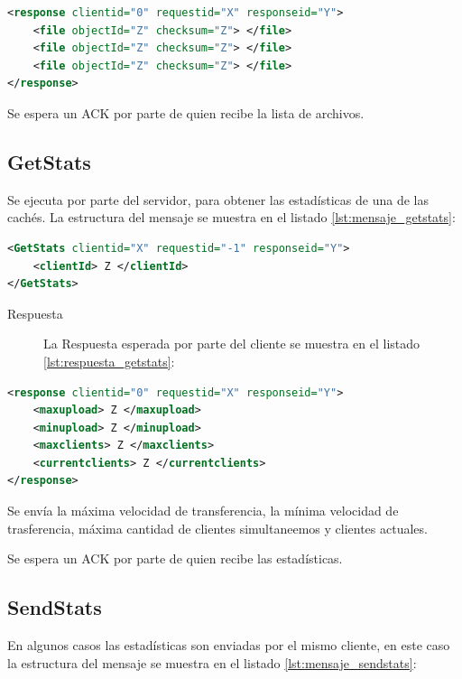 \begin{lstlisting}[language=XML,caption={Mensaje de Respuesta de GetListOfFiles},label={lst:respuesta_getlistoffiles}]
<response clientid="0" requestid="X" responseid="Y"> 
	<file objectId="Z" checksum="Z"> </file>
	<file objectId="Z" checksum="Z"> </file>
	<file objectId="Z" checksum="Z"> </file>
</response>
\end{lstlisting}

Se espera un ACK por parte de quien recibe la lista de archivos.

\subsection{GetStats}
Se ejecuta por parte del servidor, para obtener las estadísticas de una de las cachés. La estructura del mensaje se muestra en el listado \ref{lst:mensaje_getstats}:

\begin{lstlisting}[language=XML,caption={Mensaje de GetStats},label={lst:mensaje_getstats}]
<GetStats clientid="X" requestid="-1" responseid="Y"> 
	<clientId> Z </clientId>
</GetStats>
\end{lstlisting}



\begin{description}
\item[Respuesta] La Respuesta esperada por parte del cliente se muestra en el listado \ref{lst:respuesta_getstats}:
\end{description}

\begin{lstlisting}[language=XML,caption={Mensaje de Respuesta de GetStats},label={lst:respuesta_getstats}]
<response clientid="0" requestid="X" responseid="Y"> 
	<maxupload> Z </maxupload>
	<minupload> Z </minupload>
	<maxclients> Z </maxclients>
	<currentclients> Z </currentclients>
</response>
\end{lstlisting}

Se envía la máxima velocidad de transferencia, la mínima velocidad de trasferencia, máxima cantidad de clientes simultaneemos y clientes actuales.

Se espera un ACK por parte de quien recibe las estadísticas.

\subsection{SendStats}

En algunos casos las estadísticas son enviadas por el mismo cliente, en este caso la estructura del mensaje se muestra en el listado \ref{lst:mensaje_sendstats}:

